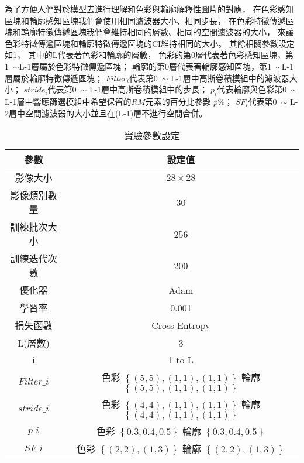 \documentclass[class=NCU\_thesis, crop=false]{standalone}
\begin{document}
    為了方便人們對於模型去進行理解和色彩與輪廓解釋性圖片的對應，
    在色彩感知區塊和輪廓感知區塊我們會使用相同濾波器大小、相同步長，
    在色彩特徵傳遞區塊和輪廓特徵傳遞區塊我們會維持相同的層數、相同的空間濾波器的大小，
    來讓色彩特徵傳遞區塊和輪廓特徵傳遞區塊的CI維持相同的大小。
    其餘相關參數設定如\cref{tab:ColoredModelparameters}，
    其中的L代表著色彩和輪廓的層數，
    色彩的第0層代表著色彩感知區塊，第1~$\sim$L-1層屬於色彩特徵傳遞區塊；
    輪廓的第0層代表著輪廓感知區塊，第1~$\sim$L-1層屬於輪廓特徵傳遞區塊；
    $Filter_{i}$代表第0~$\sim$ L-1層中高斯卷積模組中的濾波器大小；
    $stride_{i}$代表第0~$\sim$ L-1層中高斯卷積模組中的步長；
    $p_{i}$代表輪廓與色彩第0~$\sim$ L-1層中響應篩選模組中希望保留的$RM$元素的百分比參數 $p\%$；
    $SF_{i}$代表第0~$\sim$ L-2層中空間濾波器的大小並且在(L-1)層不進行空間合併。

    \begin{table}[H]
        \centering
        \caption{實驗參數設定}
        \label{tab:ColoredModelparameters}
        \begin{tabular}{| c | c |}
            \hline
            參數 & 設定值 \\
            \hline
            \hline
            影像大小 & $28\times28$ \\
            \hline
            影像類別數量 & 30 \\
            \hline
            訓練批次大小 & 256 \\
            \hline
            訓練迭代次數 & 200 \\
            \hline
            優化器 & Adam \\
            \hline
            學習率 & 0.001 \\
            \hline
            損失函數 & Cross Entropy \\
            \hline
            L(層數) & 3 \\
            \hline
            i & 1 to L \\
            \hline
            $Filter\_{i}$ & \makecell{色彩 $\left\{(5, 5), (1, 1), (1, 1)\right\}$ \\ 輪廓 $\left\{(5, 5), (1, 1), (1, 1)\right\}$ }\\
            \hline 
            $stride\_{i}$ & \makecell{色彩 $\left\{(4, 4), (1, 1), (1, 1)\right\}$ \\ 輪廓 $\left\{(4, 4), (1, 1), (1, 1)\right\}$ } \\
            \hline
            $p\_{i}$ & \makecell{色彩 $\left\{0.3, 0.4, 0.5\right\}$  \\ 輪廓 $\left\{0.3, 0.4, 0.5\right\}$ } \\
            \hline
            $SF\_{i}$ &  \makecell{色彩 $\left\{(2, 2), (1, 3)\right\}$ \\ 輪廓 $\left\{(2, 2), (1, 3)\right\}$ }  \\
            \hline 
        \end{tabular}
    \end{table} 
    \pagebreak
\end{document}
